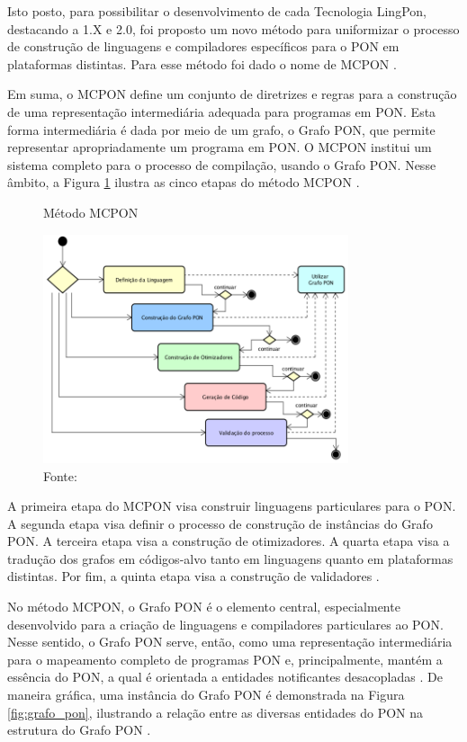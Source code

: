 Isto posto, para possibilitar o desenvolvimento de cada Tecnologia LingPon,
destacando a 1.X e 2.0, foi proposto um novo método para uniformizar o processo
de construção de linguagens e compiladores específicos para o PON em plataformas
distintas. Para esse método foi dado o nome de MCPON \cite{doc_ronszcka_2019}.

Em suma, o MCPON define um conjunto de diretrizes e regras para a construção de
uma representação intermediária adequada para programas em PON. Esta forma
intermediária é dada por meio de um grafo, o Grafo PON, que permite representar
apropriadamente um programa em PON. O MCPON institui um sistema completo para o
processo de compilação, usando o Grafo PON. Nesse âmbito, a Figura
\ref{fig:mcpon} ilustra as cinco etapas do método MCPON
\cite{doc_ronszcka_2019}.

\begin{figure}[!htb]
  \centering
  \caption{Método MCPON}
  \includegraphics[width=0.8\textwidth]{../figures/metodo_mcpon.png}
  \smallskip
  \caption*{Fonte: }
  \label{fig:mcpon}
\end{figure}

A primeira etapa do MCPON visa construir linguagens particulares para o PON. A
segunda etapa visa definir o processo de construção de instâncias do Grafo PON.
A terceira etapa visa a construção de otimizadores. A quarta etapa visa a
tradução dos grafos em códigos-alvo tanto em linguagens quanto em plataformas
distintas. Por fim, a quinta etapa visa a construção de validadores
\cite{doc_ronszcka_2019}.

No método MCPON, o Grafo PON é o elemento central, especialmente desenvolvido
para a criação de linguagens e compiladores particulares ao PON. Nesse sentido,
o Grafo PON serve, então, como uma representação intermediária para o mapeamento
completo de programas PON e, principalmente, mantém a essência do PON, a qual é
orientada a entidades notificantes desacopladas \cite{doc_ronszcka_2019}. De
maneira gráfica, uma instância do Grafo PON é demonstrada na Figura
\ref{fig:grafo_pon}, ilustrando a relação entre as diversas entidades do PON
na estrutura do Grafo PON \cite{msc_negrini_2019}.

